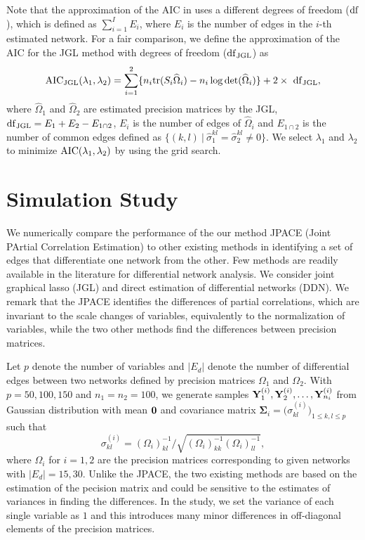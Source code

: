 \documentclass[useAMS,usenatbib,referee]{bio}
\newcommand{\bs}{\boldsymbol}
\begin{document}
{{Note that the approximation of the AIC in \citet{Danaher:2014} uses a different degrees of freedom (${\rm df}$), which is defined as $ \sum_{i=1}^I E_i$, where $E_i$ is the number of edges in the $i$-th estimated network. 
For a fair comparison, we define the approximation of the AIC for the JGL method with degrees of freedom (${\rm df}_{\rm JGL}$) as
\begin{equation} \nonumber 
{\rm AIC}_{\rm JGL}(\lambda_1,\lambda_2)=
 \sum_{i=1}^2 \{ n_i {\rm tr}(S_i \widehat{\Omega}_i) - n_i \log {\rm det}(\widehat{\Omega}_i) \} + 2 \times ~ {\rm df}_{\rm JGL},
\end{equation}
where $\widehat{\Omega}_1$ and $\widehat{\Omega}_2$ are estimated precision matrices by the JGL, ${\rm df}_{\rm JGL}= E_1 + E_2 - E_{1 \cap 2}$, $E_i$ is the number of edges of $\widehat{\Omega}_i$ and $E_{1 \cap 2}$ is the number of common edges defined as $\{ (k,l) ~|~ \widehat{\sigma}_1^{kl} = \widehat{\sigma}_2^{kl} \neq 0\}$. 
We select $\lambda_1$ and $\lambda_2$ to minimize ${\rm AIC}(\lambda_1,\lambda_2)$ by using the grid search.




\section{Simulation Study}

We numerically compare the performance of the our method JPACE (Joint PArtial Correlation Estimation) to other existing methods in identifying a set of edges that differentiate one network from the other. Few methods are readily available in the literature for differential network analysis. 
We consider joint graphical lasso (JGL) and direct estimation of differential networks (DDN). 
We remark that the JPACE identifies the differences of partial correlations, which are invariant to the scale changes of variables, equivalently to the normalization of variables, while the two other methods find the differences between precision matrices.


Let $p$ denote the number of variables and $|E_d|$ denote the number of differential edges between two networks defined by precision matrices $\Omega_1$ and $\Omega_2$.
With $p=50, 100, 150$ and $n_1=n_2=100$,
we generate samples ${\bf Y}^{(i)}_1, {\bf Y}^{(i)}_2, \ldots,{\bf Y}^{(i)}_{n_i} $ from Gaussian distribution with mean ${\bf 0}$ and covariance matrix $\bs{\Sigma}_i = \big(\sigma_{kl}^{(i)}\big)_{1\le k,l \le p}$  such that 
\begin{equation} \nonumber
\sigma_{kl}^{(i)} = (\Omega_i)^{-1}_{kl} \big / \sqrt{(\Omega_i)^{-1}_{kk} (\Omega_i)^{-1}_{ll}} ,
\end{equation}
where $\Omega_i$ for $i=1,2$ are the precision matrices corresponding to given networks with $|E_d | = 15, 30$. Unlike the JPACE, the two existing methods are based on the estimation of the pecision matrix and could be sensitive to the estimates of variances in finding the differences. 
In the study, we set the variance of each single variable as $1$ and this introduces many minor differences in off-diagonal elements of the precision matrices.

}}
\end{document}
